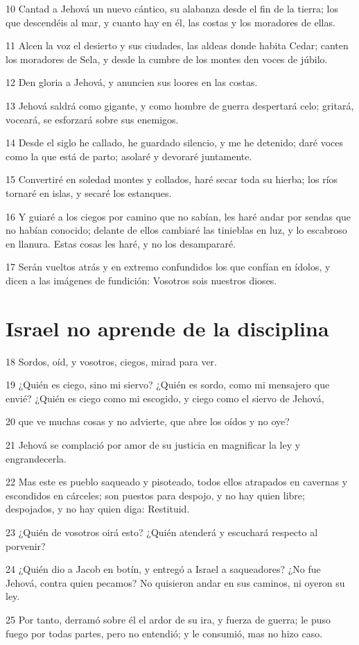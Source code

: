 \par 10 Cantad a Jehová un nuevo cántico, su alabanza desde el fin de la tierra; los que descendéis al mar, y cuanto hay en él, las costas y los moradores de ellas.
\par 11 Alcen la voz el desierto y sus ciudades, las aldeas donde habita Cedar; canten los moradores de Sela, y desde la cumbre de los montes den voces de júbilo.
\par 12 Den gloria a Jehová, y anuncien sus loores en las costas.
\par 13 Jehová saldrá como gigante, y como hombre de guerra despertará celo; gritará, voceará, se esforzará sobre sus enemigos.
\par 14 Desde el siglo he callado, he guardado silencio, y me he detenido; daré voces como la que está de parto; asolaré y devoraré juntamente.
\par 15 Convertiré en soledad montes y collados, haré secar toda su hierba; los ríos tornaré en islas, y secaré los estanques.
\par 16 Y guiaré a los ciegos por camino que no sabían, les haré andar por sendas que no habían conocido; delante de ellos cambiaré las tinieblas en luz, y lo escabroso en llanura. Estas cosas les haré, y no los desampararé.
\par 17 Serán vueltos atrás y en extremo confundidos los que confían en ídolos, y dicen a las imágenes de fundición: Vosotros sois nuestros dioses.

\section*{Israel no aprende de la disciplina}

\par 18 Sordos, oíd, y vosotros, ciegos, mirad para ver.
\par 19 ¿Quién es ciego, sino mi siervo? ¿Quién es sordo, como mi mensajero que envié? ¿Quién es ciego como mi escogido, y ciego como el siervo de Jehová,
\par 20 que ve muchas cosas y no advierte, que abre los oídos y no oye?
\par 21 Jehová se complació por amor de su justicia en magnificar la ley y engrandecerla.
\par 22 Mas este es pueblo saqueado y pisoteado, todos ellos atrapados en cavernas y escondidos en cárceles; son puestos para despojo, y no hay quien libre; despojados, y no hay quien diga: Restituid.
\par 23 ¿Quién de vosotros oirá esto? ¿Quién atenderá y escuchará respecto al porvenir?
\par 24 ¿Quién dio a Jacob en botín, y entregó a Israel a saqueadores? ¿No fue Jehová, contra quien pecamos? No quisieron andar en sus caminos, ni oyeron su ley.
\par 25 Por tanto, derramó sobre él el ardor de su ira, y fuerza de guerra; le puso fuego por todas partes, pero no entendió; y le consumió, mas no hizo caso.

